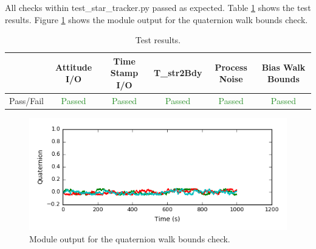 \documentclass[]{BasiliskReportMemo}
\begin{document}
All checks within test\_star\_tracker.py passed as expected. Table \ref{tab:results} shows the test results. Figure \ref{fig:walkbounds} shows the module output for the quaternion walk bounds check.

\begin{table}[htbp]
	\caption{Test results.}
	\label{tab:results}
	\centering \fontsize{10}{10}\selectfont
	\begin{tabular}{c | c | c | c | c | c } %
		\hline
		   & Attitude I/O & Time Stamp I/O & T\_str2Bdy & Process Noise & Bias Walk Bounds \\
		\hline
		Pass/Fail & \textcolor{ForestGreen}{Passed} & \textcolor{ForestGreen}{Passed} &  \textcolor{ForestGreen}{Passed}&  \textcolor{ForestGreen}{Passed} & \textcolor{ForestGreen}{Passed}\\
		\hline
	\end{tabular}
\end{table}


\begin{figure}
	\centering
	\includegraphics[width=0.7\linewidth]{Figures/walkbounds}
	\caption{Module output for the quaternion walk bounds check.}
	\label{fig:walkbounds}
\end{figure}
\end{document}

